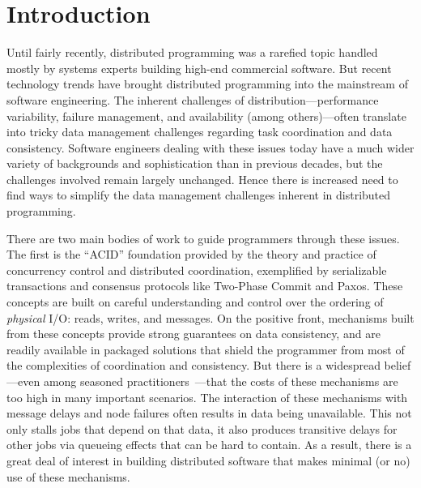 \section{Introduction}

Until fairly recently, distributed programming was a rarefied topic handled mostly by systems experts building high-end commercial software. But recent technology trends have brought distributed programming into the mainstream of software engineering.  The inherent challenges of distribution---performance variability, failure management, and availability (among others)---often translate into tricky data management challenges regarding task coordination and data consistency.  Software engineers dealing with these issues today have a much wider variety of backgrounds and sophistication than in previous decades, but the challenges involved remain largely unchanged.  Hence there is increased need to find ways to simplify the data management challenges inherent in distributed programming.

There are two main bodies of work to guide programmers through these issues.  The first is the ``ACID'' foundation provided by the theory and practice of concurrency control and distributed coordination, exemplified by serializable transactions and consensus protocols like Two-Phase Commit and Paxos.  These concepts are built on careful understanding and control over the ordering of {\em physical} I/O: reads, writes, and messages.  On the positive front, mechanisms built from these concepts provide strong guarantees on data consistency, and are readily available in packaged solutions that shield the programmer from most of the complexities of coordination and consistency.  But there is a widespread belief---even among seasoned practitioners~\cite{ladis}---that the costs of these mechanisms are too high in many important scenarios.  The interaction of these mechanisms with message delays and node failures often results in data being unavailable. This not only stalls jobs that depend on that data, it also produces transitive delays for other jobs via queueing effects that can be hard to contain.  As a result, there is a great deal of interest in building distributed software that makes minimal (or no) use of these mechanisms.

